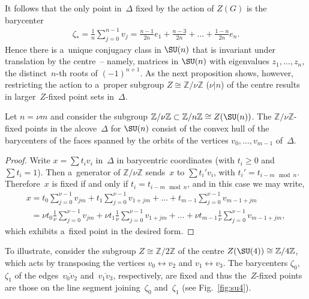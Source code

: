 It follows that the only point in~$\Delta$ f\/ixed by the action of $Z(G)$ is the barycenter
\begin{gather*}
\zeta_* = \frac{1}{n} \sum\limits_{j=0}^{n-1} v_j = \frac{n-1}{2n}e_1 + \frac{n-3}{2n} + \dots + \frac{1-n}{2n}e_n.
\end{gather*}
Hence there is a~unique conjugacy class in $\SU(n)$ that is invariant under translation by the centre~-- namely, matrices
in $\SU(n)$ with eigenvalues $z_1, \ldots, z_n$, the distinct~$n$-th roots of $(-1)^{n+1}$.
As the next proposition shows, however, restricting the action to a~proper subgroup $Z\cong
{\mathbb{Z}}/\nu{\mathbb{Z}}$ ($\nu|n$) of the centre results in larger~$Z$-f\/ixed point sets in~$\Delta$.

\begin{Proposition}
Let $n=\nu m$ and consider the subgroup ${\mathbb{Z}}/\nu{\mathbb{Z}} \subset {\mathbb{Z}}/n{\mathbb{Z}} \cong
Z(\SU(n))$.
The ${\mathbb{Z}}/\nu{\mathbb{Z}}$-fixed points in the alcove~$\Delta$ for $\SU(n)$ consist of the convex hull of the
barycenters of the faces spanned by the orbits of the vertices $v_0,\ldots,v_{m-1}$ of~$\Delta$.
\end{Proposition}

\begin{proof}
Write $x=\sum t_i v_i$ in~$\Delta$ in barycentric coordinates (with $t_i\geq 0$ and $\sum t_i=1$).
Then a~generator of ${\mathbb{Z}}/\nu{\mathbb{Z}}$ sends~$x$ to $\sum t_i' v_i$, with $t_i'=t_{i-m \mod n}$.
Therefore~$x$ is f\/ixed if and only if $t_i=t_{i-m \mod n}$, and in this case we may write,
\begin{gather*}
x=t_0 \sum\limits_{j=0}^{\nu-1} v_{jm} + t_1 \sum\limits_{j=0}^{\nu-1} v_{1+jm} + \dots + t_{m-1}
\sum\limits_{j=0}^{\nu-1} v_{m-1+jm}
\\
\phantom{x}{}
 =\nu t_0 \frac{1}{\nu}\sum\limits_{j=0}^{\nu-1} v_{jm} + \nu t_1 \frac{1}{\nu} \sum\limits_{j=0}^{\nu-1} v_{1+jm} +
\dots + \nu t_{m-1} \frac{1}{\nu}\sum\limits_{j=0}^{\nu-1} v_{m-1+jm},
\end{gather*}
which exhibits a~f\/ixed point in the desired form.
\end{proof}

To illustrate, consider the subgroup $Z \cong {\mathbb{Z}}/2{\mathbb{Z}}$ of the centre $Z(\SU(4)) \cong
{\mathbb{Z}}/4{\mathbb{Z}}$, which acts by transposing the vertices $v_0 \leftrightarrow v_2$ and $v_1 \leftrightarrow
v_3$.
The barycenters $\zeta_0$, $\zeta_1$ of the edges~$\overline{v_0v_2}$ and~$\overline{v_1v_3}$, respectively, are f\/ixed
and thus the~$Z$-f\/ixed points are those on the line segment joining~$\zeta_0$ and~$\zeta_1$
(see Fig.~\ref{fig:su4}).

